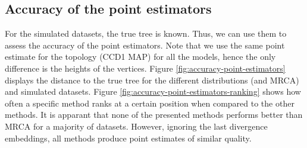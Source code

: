 \documentclass[10pt,letterpaper]{article}
\begin{document}
\subsection*{Accuracy of the point estimators}

For the simulated datasets, the true tree is known. Thus, we can use them to assess the accuracy of the point estimators. Note that we use the same point estimate for the topology (CCD1 MAP) for all the models, hence the only difference is the heights of the vertices. Figure \ref{fig:accuracy-point-estimators} displays the distance to the true tree for the different distributions (and MRCA) and simulated datasets. Figure \ref{fig:accuracy-point-estimators-ranking} shows how often a specific method ranks at a certain position when compared to the other methods. It is apparant that none of the presented methods performs better than MRCA for a majority of datasets. However, ignoring the last divergence embeddings, all methods produce point estimates of similar quality.
\end{document}
